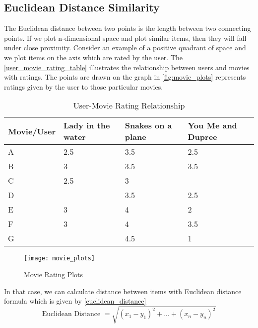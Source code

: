 \subsection{Euclidean Distance Similarity}
\label{euclidean_distance}
The Euclidean distance between two points is the length between two connecting points. If we plot n-dimensional space and plot similar items, then they will fall under close proximity. Consider an example of a positive quadrant of space and we plot items on the axis which are rated by the user. The \autoref{user_movie_rating_table} illustrates the relationship between users and movies with ratings. The points are drawn on the graph in \autoref{fig:movie_plots} represents ratings given by the user to those particular movies.
\begin{table}[]
\centering
\begin{tabular}{|l|l|l|l|}
\hline
Movie/User & Lady in the water & Snakes on a plane & You Me and Dupree \\ \hline
A          & 2.5               & 3.5               & 2.5               \\ \hline
B          & 3                 & 3.5               & 3.5               \\ \hline
C          & 2.5               & 3                 &                   \\ \hline
D          &                   & 3.5               & 2.5               \\ \hline
E          & 3                 & 4                 & 2                 \\ \hline
F          & 3                 & 4                 & 3.5               \\ \hline
G          &                   & 4.5               & 1                 \\ \hline
\end{tabular}
\caption{User-Movie Rating Relationship \cite{11}}
\label{user_movie_rating_table}
\end{table}

\begin{figure}[H]
	\centering
	\texttt{[image: movie\_plots]}
	\caption{Movie Rating Plots \cite{11} } 
	\label{fig:movie_plots}
\end{figure}

\noindent In that case, we can calculate distance between items with Euclidean distance formula which is given by \autoref{euclidean_distance}
\\
\begin{equation}
\textrm{Euclidean Distance } = \sqrt{(x_1 - y_1)^2 + ... + (x_n - y_n)^2}
\label{euclidean_distance}
\end{equation}

